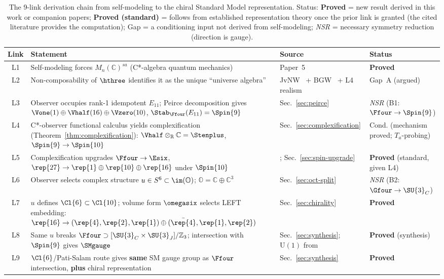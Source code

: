 \begin{table}[t]
\caption{The 9-link derivation chain from self-modeling to the chiral
Standard Model representation. Status: \textbf{Proved} = new result
derived in this work or companion papers; \textbf{Proved (standard)} =
follows from established representation theory once the prior link is
granted (the cited literature provides the computation);
\textsf{Gap} = a conditioning input not
derived from self-modeling; \textit{NSR} = necessary symmetry reduction
(direction is gauge).}
\label{tab:chain}
\begin{ruledtabular}
\begin{tabular}{clll}
Link & Statement & Source & Status \\
\midrule
L1 & Self-modeling forces $M_n(\mathbb{C})^{sa}$ (C*-algebra quantum mechanics)
   & Paper~5~\cite{Paper5} & \textbf{Proved} \\[4pt]
L2 & Non-composability of $\hthree$ identifies it as the unique ``universe algebra''
   & JvNW~\cite{JvNW1934} + BGW~\cite{BGW2020} + L4 realism
   & \textsf{Gap~A (argued)} \\[4pt]
L3 & Observer occupies rank-1 idempotent $E_{11}$; Peirce decomposition gives
     $\Vone(1) \oplus \Vhalf(16) \oplus \Vzero(10)$,
     $\Stab_{\Ffour}(E_{11}) = \Spin{9}$
   & Sec.~\ref{sec:peirce} & \textit{NSR} (B1: $\Ffour\to\Spin{9}$) \\[4pt]
L4 & C*-observer functional calculus yields complexification
     (Theorem~\ref{thm:complexification}):
     $\Vhalf \otimes_{\mathbb{R}} \mathbb{C} = \Stenplus$,
     $\Spin{9} \to \Spin{10}$
   & Sec.~\ref{sec:complexification} & \textsf{Cond.} (mechanism proved; $T_a$-probing) \\[4pt]
L5 & Complexification upgrades $\Ffour \to \Esix$,
     $\rep{27} \to \rep{1} \oplus \rep{10} \oplus \rep{16}$ under $\Spin{10}$
   & \cite{Baez2002,Yokota2009,Boyle2020}; Sec.~\ref{sec:spin-upgrade} & \textbf{Proved} (standard, given L4) \\[4pt]
L6 & Observer selects complex structure $u \in S^6 \subset \im(\mathbb{O})$;
     $\mathbb{O} = \mathbb{C} \oplus \mathbb{C}^3$
   & Sec.~\ref{sec:oct-split} & \textit{NSR} (B2: $\Gfour\to\SU{3}_C$) \\[4pt]
L7 & $u$ defines $\Cl{6} \subset \Cl{10}$; volume form $\omegasix$ selects
     LEFT embedding:
     $\rep{16} \to (\rep{4},\rep{2},\rep{1}) \oplus
     (\bar{\rep{4}},\rep{1},\rep{2})$
   & Sec.~\ref{sec:chirality} & \textbf{Proved} \\[4pt]
L8 & Same $u$ breaks $\Ffour \supset [\SU{3}_C \times \SU{3}_J]/\mathbb{Z}_3$;
     intersection with $\Spin{9}$ gives $\SMgauge$
   & Sec.~\ref{sec:synthesis}; $\mathrm{U}(1)$ from~\cite{TodorovDrenska2018} & \textbf{Proved} (synthesis) \\[4pt]
L9 & $\Cl{6}$/Pati-Salam route gives \textbf{same} SM gauge group as
     $\Ffour$ intersection, \textbf{plus} chiral representation
   & Sec.~\ref{sec:synthesis} & \textbf{Proved} \\
\end{tabular}
\end{ruledtabular}
\end{table}

